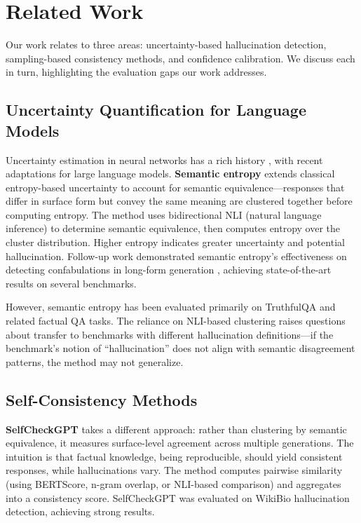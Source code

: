 \section{Related Work}
\label{sec:related}

Our work relates to three areas: uncertainty-based hallucination detection, sampling-based consistency methods, and confidence calibration. We discuss each in turn, highlighting the evaluation gaps our work addresses.

\subsection{Uncertainty Quantification for Language Models}

Uncertainty estimation in neural networks has a rich history \cite{gal2016dropout}, with recent adaptations for large language models. \textbf{Semantic entropy} \cite{kuhn2023semantic} extends classical entropy-based uncertainty to account for semantic equivalence---responses that differ in surface form but convey the same meaning are clustered together before computing entropy. The method uses bidirectional NLI (natural language inference) to determine semantic equivalence, then computes entropy over the cluster distribution. Higher entropy indicates greater uncertainty and potential hallucination. Follow-up work demonstrated semantic entropy's effectiveness on detecting confabulations in long-form generation \cite{farquhar2024detecting}, achieving state-of-the-art results on several benchmarks.

However, semantic entropy has been evaluated primarily on TruthfulQA and related factual QA tasks. The reliance on NLI-based clustering raises questions about transfer to benchmarks with different hallucination definitions---if the benchmark's notion of ``hallucination'' does not align with semantic disagreement patterns, the method may not generalize.

\subsection{Self-Consistency Methods}

\textbf{SelfCheckGPT} \cite{manakul2023selfcheckgpt} takes a different approach: rather than clustering by semantic equivalence, it measures surface-level agreement across multiple generations. The intuition is that factual knowledge, being reproducible, should yield consistent responses, while hallucinations vary. The method computes pairwise similarity (using BERTScore, n-gram overlap, or NLI-based comparison) and aggregates into a consistency score. SelfCheckGPT was evaluated on WikiBio hallucination detection, achieving strong results.


